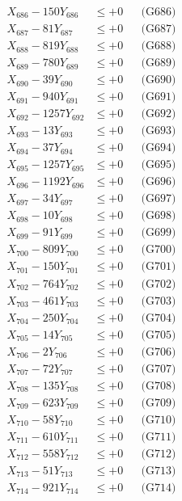 \documentclass[a4paper,10pt]{article}
\begin{document}
{\begin{align}
X_{686} - 150Y_{686} &\leq +0 && \text{(G686)} \\
X_{687} - 81Y_{687} &\leq +0 && \text{(G687)} \\
X_{688} - 819Y_{688} &\leq +0 && \text{(G688)} \\
X_{689} - 780Y_{689} &\leq +0 && \text{(G689)} \\
X_{690} - 39Y_{690} &\leq +0 && \text{(G690)} \\
\allowbreak
X_{691} - 940Y_{691} &\leq +0 && \text{(G691)} \\
X_{692} - 1257Y_{692} &\leq +0 && \text{(G692)} \\
X_{693} - 13Y_{693} &\leq +0 && \text{(G693)} \\
X_{694} - 37Y_{694} &\leq +0 && \text{(G694)} \\
X_{695} - 1257Y_{695} &\leq +0 && \text{(G695)} \\
X_{696} - 1192Y_{696} &\leq +0 && \text{(G696)} \\
X_{697} - 34Y_{697} &\leq +0 && \text{(G697)} \\
X_{698} - 10Y_{698} &\leq +0 && \text{(G698)} \\
X_{699} - 91Y_{699} &\leq +0 && \text{(G699)} \\
X_{700} - 809Y_{700} &\leq +0 && \text{(G700)} \\
\allowbreak
X_{701} - 150Y_{701} &\leq +0 && \text{(G701)} \\
X_{702} - 764Y_{702} &\leq +0 && \text{(G702)} \\
X_{703} - 461Y_{703} &\leq +0 && \text{(G703)} \\
X_{704} - 250Y_{704} &\leq +0 && \text{(G704)} \\
X_{705} - 14Y_{705} &\leq +0 && \text{(G705)} \\
X_{706} - 2Y_{706} &\leq +0 && \text{(G706)} \\
X_{707} - 72Y_{707} &\leq +0 && \text{(G707)} \\
X_{708} - 135Y_{708} &\leq +0 && \text{(G708)} \\
X_{709} - 623Y_{709} &\leq +0 && \text{(G709)} \\
X_{710} - 58Y_{710} &\leq +0 && \text{(G710)} \\
\allowbreak
X_{711} - 610Y_{711} &\leq +0 && \text{(G711)} \\
X_{712} - 558Y_{712} &\leq +0 && \text{(G712)} \\
X_{713} - 51Y_{713} &\leq +0 && \text{(G713)} \\
X_{714} - 921Y_{714} &\leq +0 && \text{(G714)} \\

\end{align}}
\end{document}
